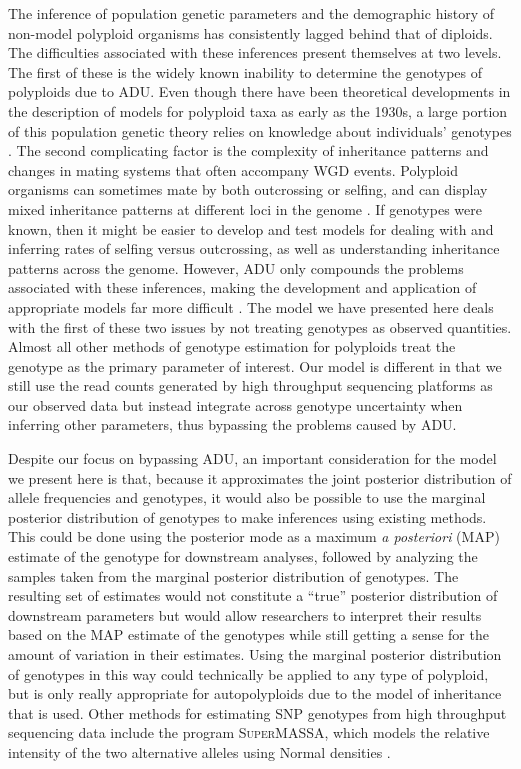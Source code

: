 \documentclass[11pt,english,letterpaper,oneside]{article}
\begin{document}
The inference of population genetic parameters and the demographic history of non-model polyploid organisms has consistently lagged behind that of diploids. The difficulties associated with these inferences present themselves at two levels. The first of these is the widely known inability to determine the genotypes of polyploids due to ADU. Even though there have been theoretical developments in the description of models for polyploid taxa as early as the 1930s, a large portion of this population genetic theory relies on knowledge about individuals' genotypes \citep[e.g.,][]{haldane1930autopolyploids,wright1938polyploid}. The second complicating factor is the complexity of inheritance patterns and changes in mating systems that often accompany WGD events. Polyploid organisms can sometimes mate by both outcrossing or selfing, and can display mixed inheritance patterns at different loci in the genome \citep{dufresne2014polyPopGen}. If genotypes were known, then it might be easier to develop and test models for dealing with and inferring rates of selfing versus outcrossing, as well as understanding inheritance patterns across the genome. However, ADU only compounds the problems associated with these inferences, making the development and application of appropriate models far more difficult \citep[but see list of software in][]{dufresne2014polyPopGen}. The model we have presented here deals with the first of these two issues by not treating genotypes as observed quantities. Almost all other methods of genotype estimation for polyploids treat the genotype as the primary parameter of interest. Our model is different in that we still use the read counts generated by high throughput sequencing platforms as our observed data but instead integrate across genotype uncertainty when inferring other parameters, thus bypassing the problems caused by ADU.
\medskip

Despite our focus on bypassing ADU, an important consideration for the model we present here is that, because it approximates the joint posterior distribution of allele frequencies and genotypes, it would also be possible to use the marginal posterior distribution of genotypes to make inferences using existing methods. This could be done using the posterior mode as a maximum \textit{a posteriori} (MAP) estimate of the genotype for downstream analyses, followed by analyzing the samples taken from the marginal posterior distribution of genotypes. The resulting set of estimates would not constitute a ``true'' posterior distribution of downstream parameters but would allow researchers to interpret their results based on the MAP estimate of the genotypes while still getting a sense for the amount of variation in their estimates. Using the marginal posterior distribution of genotypes in this way could technically be applied to any type of polyploid, but is only really appropriate for autopolyploids due to the model of inheritance that is used. Other methods for estimating SNP genotypes from high throughput sequencing data include the program \textsc{SuperMASSA}, which models the relative intensity of the two alternative alleles using Normal densities \citep{serang2012supermassa}.
\medskip
\end{document}
